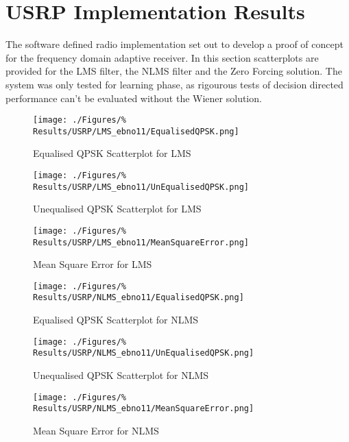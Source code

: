 \section{USRP Implementation Results}
\label{sec:USRPResults}
\FloatBarrier
The software defined radio implementation set out to develop %
a proof of concept for the frequency domain adaptive receiver. In %
this section scatterplots are provided for the LMS filter, the NLMS %
filter and the Zero Forcing solution. The system was only tested %
for learning phase, as rigourous tests of decision directed %
performance can't be evaluated without the Wiener solution.

\begin{figure}[ht]
	\centering
	\begin{minipage}{0.49\textwidth}
		\centering
		\texttt{[image: ./Figures/\%
		Results/USRP/LMS\_ebno11/EqualisedQPSK.png]}
		\captionsetup{width=0.75\linewidth}
		\caption{Equalised QPSK Scatterplot for LMS}
	\end{minipage}
	\begin{minipage}{0.49\textwidth}
		\centering
		\texttt{[image: ./Figures/\%
		Results/USRP/LMS\_ebno11/UnEqualisedQPSK.png]}
		\captionsetup{width=0.75\linewidth}
		\caption{Unequalised QPSK Scatterplot for LMS}
	\end{minipage}
\end{figure}
\begin{figure}[ht]
	\centering
	\texttt{[image: ./Figures/\%
	Results/USRP/LMS\_ebno11/MeanSquareError.png]}
	\captionsetup{width=0.75\linewidth}
	\caption{Mean Square Error for LMS}
\end{figure}

\begin{figure}[ht]
	\centering
	\begin{minipage}{0.49\textwidth}
		\centering
		\texttt{[image: ./Figures/\%
		Results/USRP/NLMS\_ebno11/EqualisedQPSK.png]}
		\captionsetup{width=0.75\linewidth}
		\caption{Equalised QPSK Scatterplot for NLMS}
	\end{minipage}
	\begin{minipage}{0.49\textwidth}
		\centering
		\texttt{[image: ./Figures/\%
		Results/USRP/NLMS\_ebno11/UnEqualisedQPSK.png]}
		\captionsetup{width=0.75\linewidth}
		\caption{Unequalised QPSK Scatterplot for NLMS}
	\end{minipage}
\end{figure}
\begin{figure}[ht]
	\centering
	\texttt{[image: ./Figures/\%
	Results/USRP/NLMS\_ebno11/MeanSquareError.png]}
	\captionsetup{width=0.75\linewidth}
	\caption{Mean Square Error for NLMS}
\end{figure}

